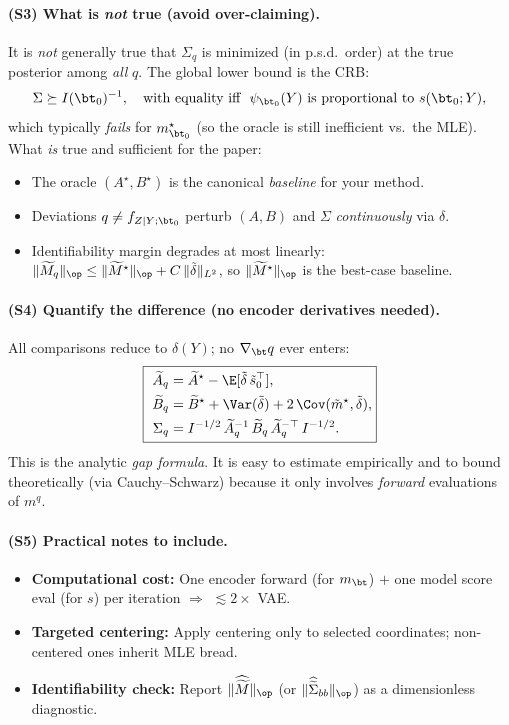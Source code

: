 \paragraph{(S3) What is \emph{not} true (avoid over-claiming).}
It is \emph{not} generally true that $\Sigma_q$ is minimized (in p.s.d.\ order) at the true posterior among \emph{all} $q$. The global lower bound is the CRB:
\[
\Sigma \succeq I(\bt_0)^{-1},\quad\text{with equality iff }\ \psi_{\bt_0}(Y)\ \text{is proportional to }s(\bt_0;Y),
\]
which typically \emph{fails} for $m^\star_{\bt_0}$ (so the oracle is still inefficient vs.\ the MLE).  
What \emph{is} true and sufficient for the paper:
\begin{itemize}
\item The oracle $(A^\star,B^\star)$ is the canonical \emph{baseline} for your method.
\item Deviations $q\neq f_{Z\mid Y;\bt_0}$ perturb $(A,B)$ and $\Sigma$ \emph{continuously} via $\delta$.
\item Identifiability margin degrades at most linearly: $\|\widetilde M_q\|_{\op}\le \|\widetilde M^\star\|_{\op}+C\,\|\tilde\delta\|_{L^2}$, so $\|\widetilde M^\star\|_{\op}$ is the best-case baseline.
\end{itemize}

\paragraph{(S4) Quantify the difference (no encoder derivatives needed).}
All comparisons reduce to $\delta(Y)$; no $\nabla_\bt q$ ever enters:
\[
\boxed{\
\begin{aligned}
\widetilde A_q&=\widetilde A^\star-\E[\tilde\delta\,\tilde s_0^\top],\\
\widetilde B_q&=\widetilde B^\star+\Var(\tilde\delta)+2\,\Cov(\tilde m^\star,\tilde\delta),\\
\Sigma_q&=I^{-1/2}\,\widetilde A_q^{-1}\,\widetilde B_q\,\widetilde A_q^{-\top}\,I^{-1/2}.
\end{aligned}
}
\]
This is the analytic \emph{gap formula}. It is easy to estimate empirically and to bound theoretically (via Cauchy–Schwarz) because it only involves \emph{forward} evaluations of $m^q$.

\paragraph{(S5) Practical notes to include.}
\begin{itemize}
\item \textbf{Computational cost:} One encoder forward (for $m_\bt$) $+$ one model score eval (for $s$) per iteration $\Rightarrow$ $\lesssim 2\times$ VAE.
\item \textbf{Targeted centering:} Apply centering only to selected coordinates; non-centered ones inherit MLE bread.
\item \textbf{Identifiability check:} Report $\|\widehat{\widetilde M}\|_{\op}$ (or $\|\widehat{\widetilde\Sigma}_{bb}\|_{\op}$) as a dimensionless diagnostic.
\end{itemize}

